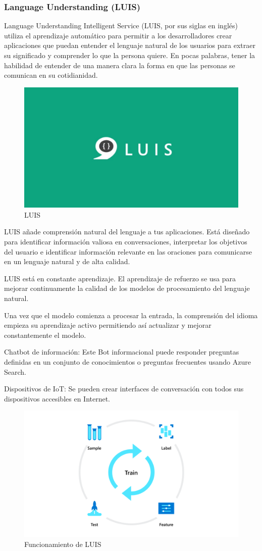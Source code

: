\subsubsection{Language Understanding (LUIS)}

Language Understanding Intelligent Service (LUIS, por sus siglas en inglés) utiliza el aprendizaje automático para permitir a los desarrolladores crear aplicaciones que puedan entender el lenguaje natural de los usuarios para extraer su significado y comprender lo que la persona quiere. En pocas palabras, tener la habilidad de entender de una manera clara la forma en que las personas se comunican en su cotidianidad.

\begin{figure}[htbp]
\centerline{\includegraphics[width = 0.5 \textwidth]{fig39.jpg}}
\caption{LUIS}
\label{fig39}
\end{figure}

LUIS añade comprensión natural del lenguaje a tus aplicaciones. Está diseñado para identificar información valiosa en conversaciones, interpretar los objetivos del usuario e identificar información relevante en las oraciones para comunicarse en un lenguaje natural y de alta calidad.

LUIS está en constante aprendizaje. El aprendizaje de refuerzo se usa para mejorar continuamente la calidad de los modelos de procesamiento del lenguaje natural.

Una vez que el modelo comienza a procesar la entrada, la comprensión del idioma empieza su aprendizaje activo permitiendo así actualizar y mejorar constantemente el modelo.

Chatbot de información: Este Bot informacional puede responder preguntas definidas en un conjunto de conocimientos o preguntas frecuentes usando Azure Search.

Dispositivos de IoT: Se pueden crear interfaces de conversación con todos sus dispositivos accesibles en Internet.

\begin{figure}[htbp]
\centerline{\includegraphics[width = 0.5 \textwidth]{fig40.png}}
\caption{Funcionamiento de LUIS}
\label{fig40}
\end{figure}


